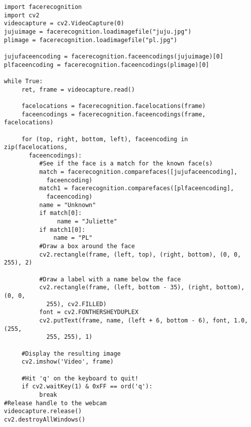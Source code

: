 \begin{verbatim}
import facerecognition
import cv2
videocapture = cv2.VideoCapture(0)
jujuimage = facerecognition.loadimagefile("juju.jpg")
plimage = facerecognition.loadimagefile("pl.jpg")

jujufaceencoding = facerecognition.faceencodings(jujuimage)[0]
plfaceencoding = facerecognition.faceencodings(plimage)[0]

while True:
     ret, frame = videocapture.read()

     facelocations = facerecognition.facelocations(frame)
     faceencodings = facerecognition.faceencodings(frame, facelocations)

     for (top, right, bottom, left), faceencoding in zip(facelocations,
       faceencodings):
          #See if the face is a match for the known face(s)
          match = facerecognition.comparefaces([jujufaceencoding],
            faceencoding)
          match1 = facerecognition.comparefaces([plfaceencoding],
            faceencoding)
          name = "Unknown"
          if match[0]:
               name = "Juliette"
          if match1[0]:
              name = "PL"
          #Draw a box around the face
          cv2.rectangle(frame, (left, top), (right, bottom), (0, 0, 255), 2)

          #Draw a label with a name below the face
          cv2.rectangle(frame, (left, bottom - 35), (right, bottom), (0, 0,
            255), cv2.FILLED)
          font = cv2.FONTHERSHEYDUPLEX
          cv2.putText(frame, name, (left + 6, bottom - 6), font, 1.0, (255,
            255, 255), 1)

     #Display the resulting image
     cv2.imshow('Video', frame)

     #Hit 'q' on the keyboard to quit!
     if cv2.waitKey(1) & 0xFF == ord('q'):
          break
#Release handle to the webcam
videocapture.release()
cv2.destroyAllWindows()
\end{verbatim}
